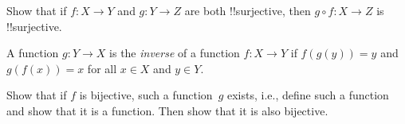 \documentclass[../../include/open-logic-section]{subfiles}
\begin{document}
\begin{prob}
Show that if $f \colon X \to Y$ and $g \colon Y \to Z$ are both
!!{surjective}, then $g \circ f \colon X \to Z$ is !!{surjective}.
\end{prob}

\begin{prob}
A function $g \colon Y \to X$ is the \emph{inverse} of a function $f
\colon X \to Y$ if $f(g(y)) = y$ and $g(f(x)) = x$ for all $x \in X$
and $y \in Y$.

Show that if $f$ is bijective, such a function~$g$ exists, i.e.,
define such a function and show that it is a function. Then show that
it is also bijective.
\end{prob}
\end{document}
